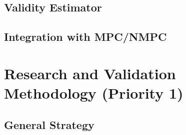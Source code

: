 \documentclass[12pt,a4paper]{report}
\begin{document}
\section{Validity Estimator}

%

\section{Integration with MPC/NMPC}

%
%


\chapter{Research and Validation Methodology (Priority 1)}

\section{General Strategy}
\end{document}
